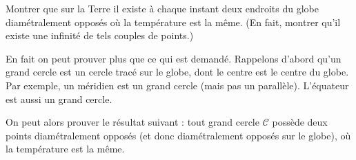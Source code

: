 \begin{exo}[Antipodes]
Montrer que sur la Terre il existe à chaque instant deux endroits du globe diamétralement opposés où la température est la même. (En fait, montrer qu'il existe une infinité de tels couples de points.)


\begin{sol}
En fait on peut prouver plus que ce qui est demandé. Rappelons d'abord qu'un grand cercle est un cercle tracé sur le globe, dont le centre est le centre du globe. Par exemple, un méridien est un grand cercle (mais pas un parallèle). L'équateur est aussi un grand cercle.

On peut alors prouver le résultat suivant : tout grand cercle $\mathcal C$ possède deux points diamétralement opposés (et donc diamétralement opposés sur le globe), où la température est la même.

\end{sol}
\end{exo}




